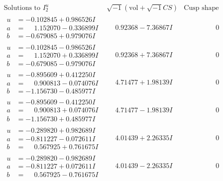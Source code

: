 \documentclass[1p]{elsarticle_modified}
\theoremstyle{definition}
\newcommand{\I}{\sqrt{-1}}
\begin{document}
$$\begin{array}{c|c|c}  
\text{Solutions to }I^u_{2}& \I (\text{vol} + \sqrt{-1}CS) & \text{Cusp shape}\\
 \hline 
\begin{aligned}
u &= -0.102845 + 0.986526 I \\
a &= \phantom{-}1.152070 - 0.336899 I \\
b &= -0.679085 + 0.979076 I\end{aligned}
 & \phantom{-}0.92368 - 7.36867 I & \phantom{-0.000000 } 0 \\ \hline\begin{aligned}
u &= -0.102845 - 0.986526 I \\
a &= \phantom{-}1.152070 + 0.336899 I \\
b &= -0.679085 - 0.979076 I\end{aligned}
 & \phantom{-}0.92368 + 7.36867 I & \phantom{-0.000000 } 0 \\ \hline\begin{aligned}
u &= -0.895609 + 0.412250 I \\
a &= \phantom{-}0.900813 - 0.074076 I \\
b &= -1.156730 - 0.485977 I\end{aligned}
 & \phantom{-}4.71477 + 1.98139 I & \phantom{-0.000000 } 0 \\ \hline\begin{aligned}
u &= -0.895609 - 0.412250 I \\
a &= \phantom{-}0.900813 + 0.074076 I \\
b &= -1.156730 + 0.485977 I\end{aligned}
 & \phantom{-}4.71477 - 1.98139 I & \phantom{-0.000000 } 0 \\ \hline\begin{aligned}
u &= -0.289820 + 0.982689 I \\
a &= -0.811227 - 0.072611 I \\
b &= \phantom{-}0.567925 + 0.761675 I\end{aligned}
 & \phantom{-}4.01439 + 2.26335 I & \phantom{-0.000000 } 0 \\ \hline\begin{aligned}
u &= -0.289820 - 0.982689 I \\
a &= -0.811227 + 0.072611 I \\
b &= \phantom{-}0.567925 - 0.761675 I\end{aligned}
 & \phantom{-}4.01439 - 2.26335 I & \phantom{-0.000000 } 0 \\ \hline\begin{aligned}

\end{aligned}
\end{array}$$
\end{document}
